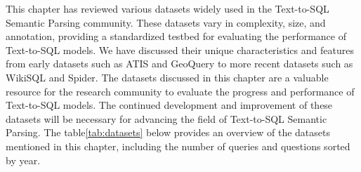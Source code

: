 
This chapter has reviewed various datasets widely used in the Text-to-SQL Semantic Parsing community. These datasets vary in complexity, size, and annotation, providing a standardized testbed for evaluating the performance of Text-to-SQL models. We have discussed their unique characteristics and features from early datasets such as ATIS and GeoQuery to more recent datasets such as WikiSQL and Spider.
The datasets discussed in this chapter are a valuable resource for the research community to evaluate the progress and performance of Text-to-SQL models. The continued development and improvement of these datasets will be necessary for advancing the field of Text-to-SQL Semantic Parsing.
The table\ref{tab:datasets} below provides an overview of the datasets mentioned in this chapter, including the number of queries and questions sorted by year.


